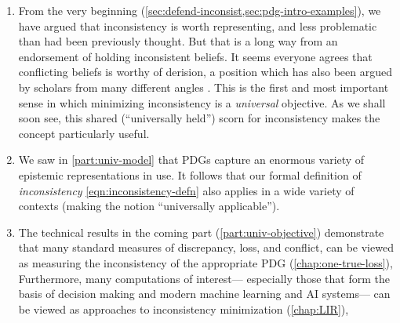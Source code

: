 \begin{enumerate}
\item
From the very beginning (\cref{sec:defend-inconsist,sec:pdg-intro-examples}), we have argued that inconsistency is worth representing, 
    and less problematic than had been previously thought.
But that is a long way from an endorsement of holding inconsistent beliefs.
%
It seems everyone agrees that conflicting beliefs is worthy of derision,
    a position which has also been argued by scholars from many different angles 
\citep{descartes,sep-dutch-book,finocchiaro1981fallacies,%
    why-be-consistent-sugden}. 
This is the first and most important
    sense in which minimizing inconsistency is a \emph{universal} objective. 
As we shall soon see, 
this shared (``universally held'') scorn for inconsistency makes the concept
    particularly useful.


\item
We saw in \cref{part:univ-model} that PDGs capture an enormous variety of epistemic representations in use.
It follows that our formal definition of \emph{inconsistency} \cref{eqn:inconsistency-defn} also applies in a wide variety of contexts
    (making the notion ``universally applicable'').

\item
The technical results in the coming part (\cref{part:univ-objective}) demonstrate that
many standard measures of discrepancy, loss, and conflict, can be viewed as measuring the inconsistency of the appropriate PDG (\cref{chap:one-true-loss}), 
%
Furthermore, many computations of interest---%
especially those that form the basis of decision making and modern machine learning and AI systems---%
can be viewed as approaches to inconsistency minimization
    (\cref{chap:LIR}),
%


\end{enumerate}
